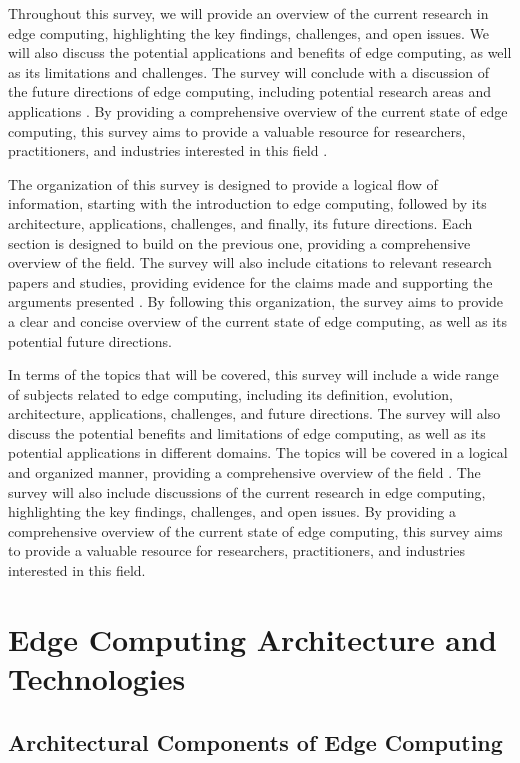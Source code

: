 \documentclass[11pt]{article}
\begin{document}
Throughout this survey, we will provide an overview of the current research in edge computing, highlighting the key findings, challenges, and open issues. We will also discuss the potential applications and benefits of edge computing, as well as its limitations and challenges. The survey will conclude with a discussion of the future directions of edge computing, including potential research areas and applications \cite{ref13}. By providing a comprehensive overview of the current state of edge computing, this survey aims to provide a valuable resource for researchers, practitioners, and industries interested in this field \cite{ref14}.

The organization of this survey is designed to provide a logical flow of information, starting with the introduction to edge computing, followed by its architecture, applications, challenges, and finally, its future directions. Each section is designed to build on the previous one, providing a comprehensive overview of the field. The survey will also include citations to relevant research papers and studies, providing evidence for the claims made and supporting the arguments presented \cite{ref15}. By following this organization, the survey aims to provide a clear and concise overview of the current state of edge computing, as well as its potential future directions.

In terms of the topics that will be covered, this survey will include a wide range of subjects related to edge computing, including its definition, evolution, architecture, applications, challenges, and future directions. The survey will also discuss the potential benefits and limitations of edge computing, as well as its potential applications in different domains. The topics will be covered in a logical and organized manner, providing a comprehensive overview of the field \cite{ref16}. The survey will also include discussions of the current research in edge computing, highlighting the key findings, challenges, and open issues. By providing a comprehensive overview of the current state of edge computing, this survey aims to provide a valuable resource for researchers, practitioners, and industries interested in this field.

\section{Edge Computing Architecture and Technologies}

\subsection{Architectural Components of Edge Computing}
\end{document}
